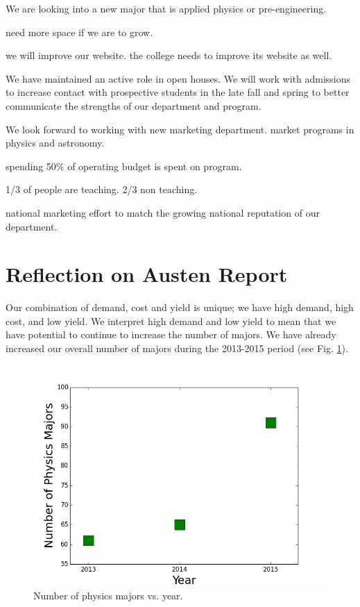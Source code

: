 \documentclass[12pt]{article}
\begin{document}
We are looking into a new major that is applied physics or pre-engineering.

need more space if we are to grow.

we will improve our website.  the college needs to improve its website as well.

We have maintained an active role in open houses.  We will work with admissions to increase
contact with prospective students in the late fall and spring to better communicate the strengths of
our department and program.


We look forward to working with new marketing department.  market programs in physics and astronomy.

spending 50\% of operating budget is spent on program.

1/3 of people are teaching.  2/3 non teaching.  

national marketing effort to match the growing national reputation of our department.


\section{Reflection on Austen Report}

Our combination of demand, cost and yield is unique; we have high demand, high cost, and low yield. 
We interpret high demand and low yield to mean that we have potential to continue to increase the number of majors.  We have already increased our overall number of majors during the 2013-2015 period (see Fig. \ref{nmajors}).
\begin{figure}[h]
\includegraphics[width=.85\textwidth]{Nmajors_year.png}
\caption{Number of physics majors vs. year.}
\label{nmajors}
\end{figure}
\end{document}
